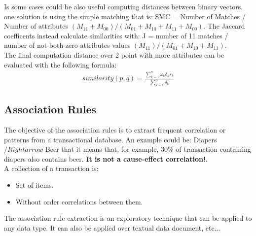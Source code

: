\documentclass[12pt]{article}
\begin{document}
Is some cases could be also useful computing distances between binary vectors, one solution is using the simple matching that is: SMC = Number of Matches / Number of attributes $(M_11 + M_00) / (M_01 + M_10 + M_11 + M_00)$. The Jaccard coefficents instead calculate similarities with: J = number of 11 matches / number of not-both-zero attributes values $(M_11) / (M_01 + M_10 + M_11)$.\\
The final computation distance over 2 point with more attributes can be evaluated with the following formula:
\begin{equation}
  \begin{gathered}
    similarity(p,q) = \frac{\sum_{k=1}^{n} \omega_k \delta_k s_k}{\sum_{k=1}^{n} \delta_k}
  \end{gathered}
\end{equation}

\subsection{Association Rules}
The objective of the association rules is to extract frequent correlation or patterns from a transactional database. An example could be:
Diapers $/Rightarrow$ Beer that it means that, for example, 30\% of transaction containing diapers also contains beer. \textbf{It is not a cause-effect correlation!}.\\
A collection of a transaction is:
\begin{itemize}
  \item Set of items.
  \item Without order correlations between them.
\end{itemize}
The association rule extraction is an exploratory technique that can be applied to any data type. It can also be applied over textual data document, etc...\\
\end{document}
